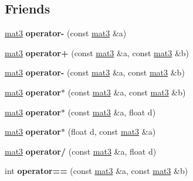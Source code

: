 \subsection*{Friends}
\begin{DoxyCompactItemize}
\item 
\hypertarget{classmat3_afff00f7c04fb265f972104856a3f6927}{\hyperlink{classmat3}{mat3} {\bfseries operator-\/} (const \hyperlink{classmat3}{mat3} \&a)}\label{classmat3_afff00f7c04fb265f972104856a3f6927}

\item 
\hypertarget{classmat3_aa66b74a348e7f3a2082b28e2874f19db}{\hyperlink{classmat3}{mat3} {\bfseries operator+} (const \hyperlink{classmat3}{mat3} \&a, const \hyperlink{classmat3}{mat3} \&b)}\label{classmat3_aa66b74a348e7f3a2082b28e2874f19db}

\item 
\hypertarget{classmat3_a9b3993c4e22141d7e09b58b8d56a3cb2}{\hyperlink{classmat3}{mat3} {\bfseries operator-\/} (const \hyperlink{classmat3}{mat3} \&a, const \hyperlink{classmat3}{mat3} \&b)}\label{classmat3_a9b3993c4e22141d7e09b58b8d56a3cb2}

\item 
\hypertarget{classmat3_a0df0a7a0901cee5daec15003ee3594fc}{\hyperlink{classmat3}{mat3} {\bfseries operator$\ast$} (const \hyperlink{classmat3}{mat3} \&a, const \hyperlink{classmat3}{mat3} \&b)}\label{classmat3_a0df0a7a0901cee5daec15003ee3594fc}

\item 
\hypertarget{classmat3_a76b9e7e7d1577fc021acd88e905950a2}{\hyperlink{classmat3}{mat3} {\bfseries operator$\ast$} (const \hyperlink{classmat3}{mat3} \&a, float d)}\label{classmat3_a76b9e7e7d1577fc021acd88e905950a2}

\item 
\hypertarget{classmat3_a14911d72ca33a80549cd133b7ed36884}{\hyperlink{classmat3}{mat3} {\bfseries operator$\ast$} (float d, const \hyperlink{classmat3}{mat3} \&a)}\label{classmat3_a14911d72ca33a80549cd133b7ed36884}

\item 
\hypertarget{classmat3_a92d3f28efcb304339498c90adf259b98}{\hyperlink{classmat3}{mat3} {\bfseries operator/} (const \hyperlink{classmat3}{mat3} \&a, float d)}\label{classmat3_a92d3f28efcb304339498c90adf259b98}

\item 
\hypertarget{classmat3_a3df45b66c3361260ebbc68da837a43bf}{int {\bfseries operator==} (const \hyperlink{classmat3}{mat3} \&a, const \hyperlink{classmat3}{mat3} \&b)}\label{classmat3_a3df45b66c3361260ebbc68da837a43bf}


\end{DoxyCompactItemize}
